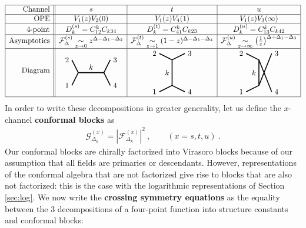 \documentclass[12pt, a4paper]{article}
\theoremstyle{break}
\begin{document}
\begin{align}
 \begin{array}{|r||c|c|c|}
  \hline 
  \text{Channel} & s & t & u
  \\ \hline
  \text{OPE} & V_1(z)V_2(0) & V_1(z)V_4(1) & V_1(z)V_3(\infty)
  \\ \hline 
  \text{4-point} & D^{(s)}_k = C_{12}^k C_{k34} & D^{(t)}_k = C_{41}^k C_{k23} & D^{(u)}_k = C_{13}^k C_{k42}
\\ \hline 
  \text{Asymptotics} & \mathcal{F}^{(s)}_{\Delta}\underset{z\to 0}{\sim} z^{\Delta-\Delta_1-\Delta_2} & \mathcal{F}^{(t)}_{\Delta}\underset{z\to 1}{\sim} (1-z)^{\Delta-\Delta_1-\Delta_4}
  & \mathcal{F}^{(u)}_\Delta  \underset{z\to \infty}{\sim} \left(\tfrac{1}{z}\right)^{\Delta+\Delta_1-\Delta_3}
  \\
  \hline 
\text{Diagram} & 
\begin{tikzpicture}[baseline=(current  bounding  box.center), very thick, scale = .3]
\draw (-1,2) node [left] {$2$} -- (0,0) -- node [above] {$k$} (4,0) -- (5,2) node [right] {$3$};
\draw (-1,-2) node [left] {$1$} -- (0,0);
\draw (4,0) -- (5,-2) node [right] {$4$};
\end{tikzpicture}
& 
\begin{tikzpicture}[baseline=(current  bounding  box.center), very thick, scale = .3]
 \draw (-2,3) node [left] {$2$} -- (0,2) -- node [left] {$k$} (0,-2) -- (-2, -3) node [left] {$1$};
\draw (0,2) -- (2,3) node [right] {$3$};
\draw (0,-2) -- (2, -3) node [right] {$4$};
\end{tikzpicture}
& 
\begin{tikzpicture}[baseline=(current  bounding  box.center), very thick, scale = .3]
\draw (-2,1) node [left] {$2$} -- (0,0) -- node [left] {$k$} (0,-4) ;
\draw (0,0)-- (2,-5) node [right] {$4$};
\draw (-2,-5) node [left] {$1$} -- (0,-4);
\draw (0,-4) -- (2,1) node [right] {$3$};
\end{tikzpicture} 
  \\
  \hline 
 \end{array}
 \label{stu}
\end{align}
In order to write these decompositions in greater generality, let us define the $x$-channel \textbf{conformal blocks} as 
\begin{align}
 \mathcal{G}^{(x)}_{\Delta_k} = \left|\mathcal{F}_{\Delta_k}^{(x)}\right|^2\ , \qquad (x=s,t,u)\ . 
 \label{gf2}
\end{align}
Our conformal blocks are chirally factorized into Virasoro blocks because of our assumption that all fields are primaries or descendants. However, representations of the conformal algebra that are not factorized give rise to blocks that are also not factorized: this is the case with the logarithmic representations of Section \ref{sec:log}. We now write the \textbf{crossing symmetry equations} as the equality between the 3 decompositions of a four-point function into structure constants and conformal blocks:
\end{document}
